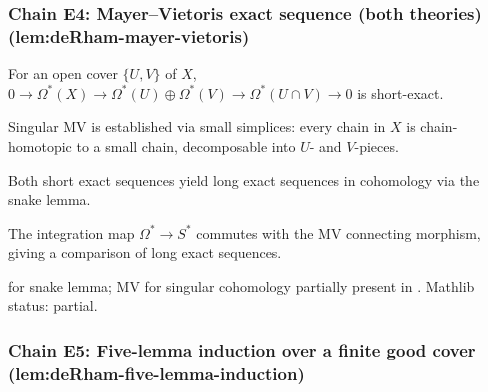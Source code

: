\subsubsection*{Chain E4: Mayer--Vietoris exact sequence (both theories) (lem:deRham-mayer-vietoris)}

\begin{lemma}
\label{lem:dmv-r1}
For an open cover $\{U, V\}$ of $X$, $0 \to \Omega^{*}(X) \to \Omega^{*}(U)\oplus\Omega^{*}(V) \to \Omega^{*}(U\cap V) \to 0$ is short-exact.
\leanok
\end{lemma}

\begin{lemma}
\label{lem:dmv-r2}
Singular MV is established via small simplices: every chain in $X$ is chain-homotopic to a small chain, decomposable into $U$- and $V$-pieces.
\leanok
\end{lemma}

\begin{lemma}
\label{lem:dmv-r3}
Both short exact sequences yield long exact sequences in cohomology via the snake lemma.
\leanok
\end{lemma}

\begin{lemma}
\label{lem:dmv-r4}
The integration map $\Omega^{*} \to S^{*}$ commutes with the MV connecting morphism, giving a comparison of long exact sequences.
\leanok
\end{lemma}

\begin{lemma}
\label{lem:dmv-r5}
 for snake lemma; MV for singular cohomology partially present in .  Mathlib status: partial.
\leanok
\end{lemma}

\subsubsection*{Chain E5: Five-lemma induction over a finite good cover (lem:deRham-five-lemma-induction)}

